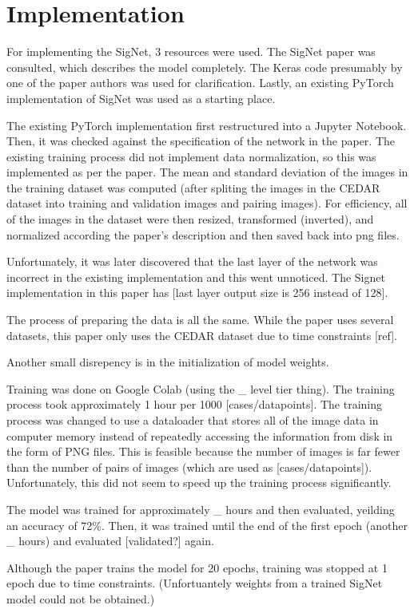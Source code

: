 \section{Implementation}\label{sec:implementation}

For implementing the SigNet, 3 resources were used.
The SigNet paper was consulted, which describes the model completely\cite{sig_net}.
The Keras code presumably by one of the paper authors was used for clarification\cite{GitHub_sounakdey}.
Lastly, an existing PyTorch implementation of SigNet was used as a starting place\cite{GitHub_signet_pytorch}.

The existing PyTorch implementation first restructured into a Jupyter Notebook.
Then, it was checked against the specification of the network in the paper.
The existing training process did not implement data normalization, so this was implemented as per the paper.
The mean and standard deviation of the images in the training dataset was computed (after spliting the images in the CEDAR dataset into training and validation images and pairing images).
For efficiency, all of the images in the dataset were then resized, transformed (inverted), and normalized according the paper's description and then saved back into png files.

Unfortunately, it was later discovered that the last layer of the network was incorrect in the existing implementation and this went unnoticed.
The Signet implementation in this paper has [last layer output size is 256 instead of 128].

The process of preparing the data is all the same.
While the paper uses several datasets, this paper only uses the CEDAR dataset due to time constraints [ref].

Another small disrepency is in the initialization of model weights.

Training was done on Google Colab (using the \_ level tier thing).
The training process took approximately 1 hour per 1000 [cases/datapoints].
The training process was changed to use a dataloader that stores all of the image data in computer memory instead of repeatedly accessing the information from disk in the form of PNG files.
This is feasible because the number of images is far fewer than the number of pairs of images (which are used as [cases/datapoints]).
Unfortunately, this did not seem to speed up the training process significantly.

The model was trained for approximately \_ hours and then evaluated, yeilding an accuracy of 72\%.
Then, it was trained until the end of the first epoch (another \_ hours) and evaluated [validated?] again.

Although the paper trains the model for 20 epochs, training was stopped at 1 epoch due to time constraints.
(Unfortuantely weights from a trained SigNet model could not be obtained.)
